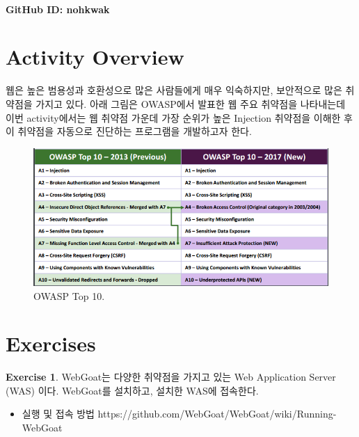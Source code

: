 \documentclass[a4paper, 11pt]{article}
\theoremstyle{definition}
\newtheorem{exercise}{Exercise}
\begin{document}
 \\
         {\phantom{} \hfill \textbf{GitHub ID: nohkwak}} \\

\section{Activity Overview}
웹은 높은 범용성과 호환성으로 많은 사람들에게 매우 익숙하지만, 보안적으로 많은 취약점을 가지고 있다. 아래 그림은 OWASP에서 발표한 웹 주요 취약점\cite{owasp}을 나타내는데 이번 activity에서는 웹 취약점 가운데 가장 순위가 높은 Injection 취약점을 이해한 후 이 취약점을 자동으로 진단하는 프로그램을 개발하고자 한다. 

\begin{figure}[h]
  \includegraphics[width=\linewidth]{owasptop.png}
  \caption{OWASP Top 10.}
  \label{fig:owasp}
\end{figure}

\section{Exercises}

\begin{exercise}

WebGoat\cite{webgoat}는 다양한 취약점을 가지고 있는 Web Application Server (WAS) 이다. WebGoat를 설치하고, 설치한 WAS에 접속한다. 

\begin{itemize}
  \item 실행 및 접속 방법 https://github.com/WebGoat/WebGoat/wiki/Running-WebGoat  
\end{itemize}

\end{exercise}
\end{document}
